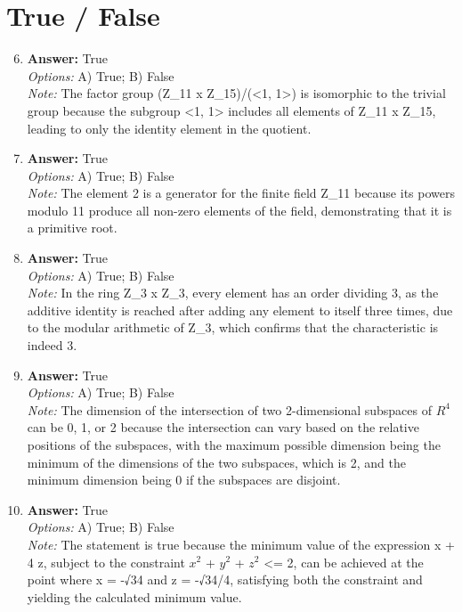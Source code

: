 \documentclass[12pt]{article}
\begin{document}
\section*{True / False}
\begin{enumerate}[label=\arabic*.]
\setcounter{enumi}{5}
\item \textbf{Answer:} True
\\ \textit{Options:} A) True; B) False
\\ \textit{Note:} The factor group (Z\_11 x Z\_15)/(\textless{}1, 1\textgreater{}) is isomorphic to the trivial group because the subgroup \textless{}1, 1\textgreater{} includes all elements of Z\_11 x Z\_15, leading to only the identity element in the quotient.
\item \textbf{Answer:} True
\\ \textit{Options:} A) True; B) False
\\ \textit{Note:} The element 2 is a generator for the finite field Z\_11 because its powers modulo 11 produce all non-zero elements of the field, demonstrating that it is a primitive root.
\item \textbf{Answer:} True
\\ \textit{Options:} A) True; B) False
\\ \textit{Note:} In the ring Z\_3 x Z\_3, every element has an order dividing 3, as the additive identity is reached after adding any element to itself three times, due to the modular arithmetic of Z\_3, which confirms that the characteristic is indeed 3.
\item \textbf{Answer:} True
\\ \textit{Options:} A) True; B) False
\\ \textit{Note:} The dimension of the intersection of two 2-dimensional subspaces of $R^4$ can be 0, 1, or 2 because the intersection can vary based on the relative positions of the subspaces, with the maximum possible dimension being the minimum of the dimensions of the two subspaces, which is 2, and the minimum dimension being 0 if the subspaces are disjoint.
\item \textbf{Answer:} True
\\ \textit{Options:} A) True; B) False
\\ \textit{Note:} The statement is true because the minimum value of the expression x + 4 z, subject to the constraint $x^2$ + $y^2$ + $z^2$ \textless{}= 2, can be achieved at the point where x = -√34 and z = -√34/4, satisfying both the constraint and yielding the calculated minimum value.
\end{enumerate}
\end{document}

